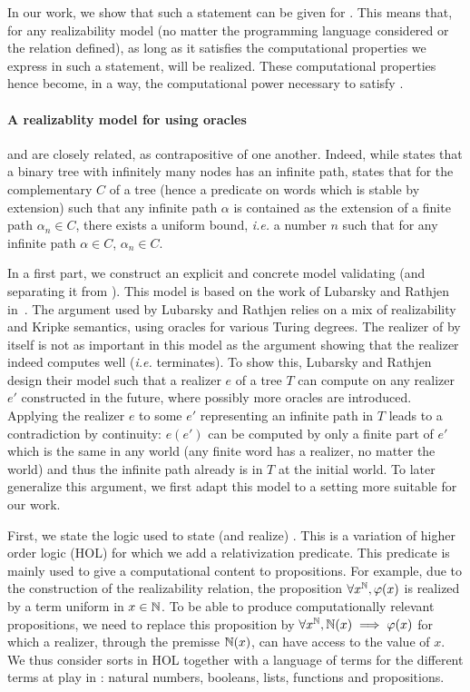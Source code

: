 \documentclass{easychair}
\begin{document}
In our work, we show that such a statement can be given for \FT. This means that, for any realizability model (no matter the programming language considered or the relation defined), as long as it satisfies the computational properties we express in such a statement, \FT will be realized. These computational properties hence become, in a way, the computational power necessary to satisfy \FT.



\paragraph{A realizablity model for \FT using oracles}
\FT and \WKL are closely related, as contrapositive of one another.
Indeed, while \WKL states that a binary tree with infinitely many nodes has an infinite path, \FT states that for the complementary $C$ of a tree (hence a predicate on words which is stable by extension) such that any infinite path $\alpha$ is contained as the extension of a finite path $\alpha_n \in C$, there exists a uniform bound, \textit{i.e.} a number $n$ such that for any infinite path $\alpha \in C$, $\alpha_n \in C$.


In a first part, we construct an explicit and concrete model validating \FT (and separating it from \WKL). This model is based on the work of Lubarsky and Rathjen in~\cite{LubRat13}. The argument used by Lubarsky and Rathjen relies on a mix of realizability and Kripke semantics, using oracles for various Turing degrees. The realizer of \FT by itself is not as important in this model as the argument showing that the realizer indeed computes well (\textit{i.e.} terminates). To show this, Lubarsky and Rathjen design their model such that a realizer $e$ of a tree $T$ can compute on any realizer $e'$ constructed in the future, where possibly more oracles are introduced. Applying the realizer $e$ to some $e'$ representing an infinite path in $T$ leads to a contradiction by continuity: $e(e')$ can be computed by only a finite part of $e'$ which is the same in any world (any finite word has a realizer, no matter the world) and thus the infinite path already is in $T$ at the initial world. To later generalize this argument, we first adapt this model to a setting more suitable for our work.

First, we state the logic used to state (and realize) \FT. This is a variation of higher order logic (HOL) for which we add a relativization predicate. This predicate is mainly used to give a computational content to propositions. For example, due to the construction of the realizability relation, the proposition $\forall x^{\mathbb N}, \varphi(x)$ is realized by a term uniform in $x \in \mathbb N$. To be able to produce computationally relevant propositions, we need to replace this proposition by $\forall x^{\mathbb N}, \mathbb N(x) \implies \varphi(x)$ for which a realizer, through the premisse $\mathbb N(x)$, can have access to the value of $x$. We thus consider sorts in HOL together with a language of terms for the different terms at play in \FT: natural numbers, booleans, lists, functions and propositions. 
\end{document}

